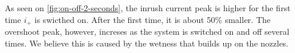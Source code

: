 \documentclass[oneside,12pt]{article}
\begin{document}
As seen on \autoref{fig:on-off-2-seconds}, the inrush current peak is higher for the first time $i_+$ is swicthed on.
After the first time, it is about 50\% smaller. The overshoot peak, however, increses as the system is switched on and off several times.
We believe this is caused by the wetness that builds up on the nozzles. 


\newpage    \pagestyle{plain}

\end{document}
